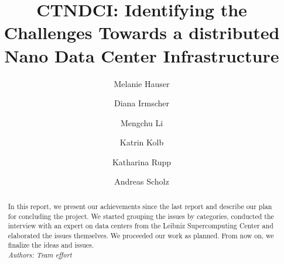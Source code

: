 \documentclass[sigchi-a, authorversion]{acmart}
\begin{document}
\title{CTNDCI: Identifying the Challenges Towards a distributed Nano Data Center Infrastructure }

\author{Melanie Hauser}

\author{Diana Irmscher} 

\author{Mengchu Li}

\author{Katrin Kolb}

\author{Katharina Rupp}

\author{Andreas Scholz}

\renewcommand{\shortauthors}{Katrin Kolb et al.}

\begin{abstract}
\label{abstract}
In this report, we present our achievements since the last report and describe our plan for concluding the project. We started grouping the issues by categories, conducted the interview with an expert on data centers from the Leibniz Supercomputing Center and elaborated the issues themselves. We proceeded our work as planned. From now on, we finalize the ideas and issues. \\
\textit{Authors: Team effort}\\
\end{abstract}


\maketitle
\end{document}
